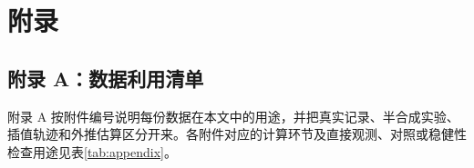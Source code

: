\FloatBarrier
{}
\makeatletter
\let\@oldaddcontentsline\addcontentsline
\renewcommand{\addcontentsline}[3]{}

\section*{附录}
\let\addcontentsline\@oldaddcontentsline
\makeatother

\renewcommand{\arraystretch}{1.2}

\subsection*{附录 A：数据利用清单}

附录 A 按附件编号说明每份数据在本文中的用途，并把真实记录、半合成实验、插值轨迹和外推估算区分开来。各附件对应的计算环节及直接观测、对照或稳健性检查用途见表\ref{tab:appendix}。

